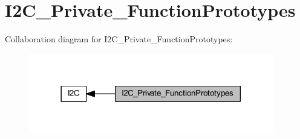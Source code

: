 \hypertarget{group___i2_c___private___function_prototypes}{}\section{I2\+C\+\_\+\+Private\+\_\+\+Function\+Prototypes}
\label{group___i2_c___private___function_prototypes}
Collaboration diagram for I2\+C\+\_\+\+Private\+\_\+\+Function\+Prototypes\+:
\nopagebreak
\begin{figure}[H]
\begin{center}
\leavevmode
\includegraphics[width=302pt]{group___i2_c___private___function_prototypes}
\end{center}
\end{figure}
